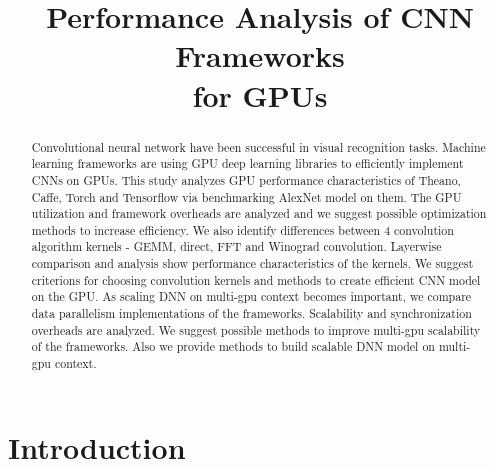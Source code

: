 \documentclass[conference]{IEEEtran}
\begin{document}
\title{Performance Analysis of CNN Frameworks\\for GPUs}

\author{
\and
{}
}

\maketitle

\begin{abstract}
Convolutional neural network have been successful in visual recognition tasks.
Machine learning frameworks are using GPU deep learning libraries to efficiently implement CNNs on GPUs.
This study analyzes GPU performance characteristics of Theano, Caffe, Torch and Tensorflow via benchmarking AlexNet model on them.
The GPU utilization and framework overheads are analyzed and we suggest possible optimization methods to increase efficiency.
We also identify differences between 4 convolution algorithm kernels - GEMM, direct, FFT and Winograd convolution.
Layerwise comparison and analysis show performance characteristics of the kernels.
We suggest criterions for choosing convolution kernels and methods to create efficient CNN model on the GPU.
As scaling DNN on multi-gpu context becomes important, we compare data parallelism implementations of the frameworks.
Scalability and synchronization overheads are analyzed.
We suggest possible methods to improve multi-gpu scalability of the frameworks.
Also we provide methods to build scalable DNN model on multi-gpu context.

\end{abstract}

\IEEEpeerreviewmaketitle


\section{Introduction}
\end{document}
